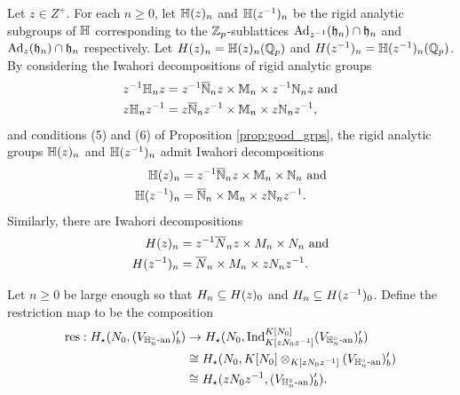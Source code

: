 \documentclass[10pt]{amsart}
\begin{document}
Let $z\in Z^{+}$. For each $n\geq 0$, let $\mathbb{H}(z)_{n}$ and $\mathbb{H}(z^{-1})_{n}$ be the rigid analytic subgroups of $\mathbb{H}$ corresponding to the $\mathbb{Z}_{p}$-sublattices $\textnormal{Ad}_{z^{-1}}(\mathfrak{h}_{n})\cap \mathfrak{h}_{n}$ and $\textnormal{Ad}_{z}(\mathfrak{h}_{n})\cap \mathfrak{h}_{n}$ respectively. Let $H(z)_{n}=\mathbb{H}(z)_{n}(\mathbb{Q}_{p})$ and $H(z^{-1})_{n}=\mathbb{H}(z^{-1})_{n}(\mathbb{Q}_{p})$. By considering the Iwahori decompositions of rigid analytic groups\begin{align*}
    z^{-1}\mathbb{H}_{n}z &= z^{-1}\overline{\mathbb{N}}_{n}z \times \mathbb{M}_{n} \times z^{-1}\mathbb{N}_{n}z \textnormal{ and}\\
    z\mathbb{H}_{n}z^{-1} &= z\overline{\mathbb{N}}_{n}z^{-1} \times \mathbb{M}_{n} \times z\mathbb{N}_{n}z^{-1},
\end{align*} and conditions (5) and (6) of Proposition \ref{prop:good_grps}, the rigid analytic groups $\mathbb{H}(z)_{n}$ and $\mathbb{H}(z^{-1})_{n}$ admit Iwahori decompositions \begin{equation}\label{eqn:Iwahori_H(z)}
\begin{split}
    \mathbb{H}(z)_{n} &=  z^{-1}\overline{\mathbb{N}}_{n}z\times \mathbb{M}_{n} \times \mathbb{N}_{n}  \textnormal{ and}\\
    \mathbb{H}(z^{-1})_{n} &= \overline{\mathbb{N}}_{n} \times \mathbb{M}_{n} \times z\mathbb{N}_{n}z^{-1}.
\end{split}
\end{equation} Similarly, there are Iwahori decompositions \begin{align*}
    H(z)_{n} &= z^{-1}\overline{N}_{n}z \times M_{n} \times N_{n} \textnormal{ and}\\
    H(z^{-1})_{n} &= \overline{N}_{n}\times M_{n} \times zN_{n}z^{-1} .
\end{align*}

Let $n\geq 0$ be large enough so that $H_{n}\subseteq H(z)_{0}$ and $H_{n}\subseteq H(z^{-1})_{0}$. Define the restriction map to be the composition \begin{equation}\label{eqn:res}
    \begin{split}
        \textnormal{res} : H_{\star}(N_{0},(V_{\mathbb{H}_{n}^{\circ}\textnormal{-an}})^{\prime}_{b}) & \rightarrow H_{\star}(N_{0},\textnormal{Ind}_{K[zN_{0}z^{-1}]}^{K[N_{0}]}(V_{\mathbb{H}_{n}^{\circ}\textnormal{-an}})^{\prime}_{b}) \\
        & \cong H_{\star}(N_{0},K[N_{0}]\otimes_{K[zN_{0}z^{-1}]}(V_{\mathbb{H}_{n}^{\circ}\textnormal{-an}})^{\prime}_{b}) \\
        & \cong H_{\star}(zN_{0}z^{-1},(V_{\mathbb{H}_{n}^{\circ}\textnormal{-an}})^{\prime}_{b}).
    \end{split}
\end{equation}
\end{document}

